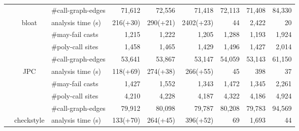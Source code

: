 \begin{table}[]
\begin{tabular}{@{}c|clrrrrrr@{}}
&                            & \#call-graph-edges   & 71,612                        & 72,556                      & 71,418                      & 72,113                    & 71,408                    & 84,330                      \\\cmidrule(){2-9}
&\multirow{4}{*}{bloat}      & analysis time (s)    & 216(+30)                     & 290(+21)                   & 2402(+23)                  & 44                       & 2,422                     & 20                         \\
&                            & \#may-fail casts     & 1,215                         & 1,222                       & 1,205                       & 1,288                     & 1,193                     & 1,924                       \\
&                            & \#poly-call sites    & 1,458                         & 1,465                       & 1,429                       & 1,496                     & 1,427                     & 2,014                       \\%
&                            & \#call-graph-edges   & 53,641                        & 53,867                      & 53,147                      & 54,059                    & 53,143                    & 61,150                      \\\cmidrule(){2-9}
&\multirow{4}{*}{JPC}        & analysis time (s)    & 118(+69)                     & 274(+38)                   & 266(+55)                   & 45                       & 398                      & 37                         \\
&                            & \#may-fail casts     & 1,427                         & 1,552                       & 1,343                       & 1,472                     & 1,345                     & 2,261                       \\
&                            & \#poly-call sites    & 4,210                         & 4,228                       & 4,187                       & 4,322                     & 4,186                     & 4,924                       \\%
&                            & \#call-graph-edges   & 79,912                        & 80,098                      & 79,787                      & 80,208                    & 79,783                    & 94,569                      \\\cmidrule(){2-9}
&\multirow{4}{*}{checkstyle} & analysis time (s)    & 133(+70)                     & 264(+45)                   & 396(+52)                   & 69                       & 1,693                     & 44                         \\

\end{tabular}
\end{table}
